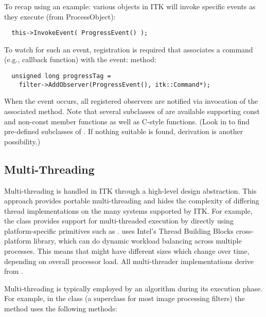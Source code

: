 To recap using an example: various objects in ITK will invoke specific events
as they execute (from ProcessObject):
\small
\begin{verbatim}
  this->InvokeEvent( ProgressEvent() );
\end{verbatim}
\normalsize

To watch for such an event, registration is required that associates a
command (e.g., callback function) with the event:
 method:
\small
\begin{verbatim}
  unsigned long progressTag =
    filter->AddObserver(ProgressEvent(), itk::Command*);
\end{verbatim}
\normalsize

When the event occurs, all registered observers are notified via invocation
of the associated  method. Note that several
subclasses of  are available supporting const and
non-const member functions as well as C-style functions. (Look in
 to find pre-defined subclasses of
. If nothing suitable is found, derivation is another
possibility.)

\subsection{Multi-Threading}
\label{sec:MultiThreading}

Multi-threading is handled in ITK through a high-level design
abstraction. This approach provides portable multi-threading and hides the
complexity of differing thread implementations on the many systems supported
by ITK. For example, the class  provides support for
multi-threaded execution by directly using platform-specific primitives such as
.  uses Intel's
Thread Building Blocks cross-platform library,
which can do dynamic workload balancing across multiple processes.
This means that  might have different sizes
which change over time, depending on overall processor load.
All multi-threader implementations derive from .

Multi-threading is typically employed by an algorithm during its execution
phase. For example, in the
class  (a superclass for most image processing filters)
the  method uses the following methods:

